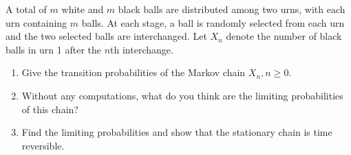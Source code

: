 \begin{exercise}%
\label{ex:markov-chains-70}
A total of $m$ white and $m$ black balls are distributed among two urns, with each urn containing $m$ balls. At each stage, a ball is randomly selected from each urn and the two selected balls are interchanged. Let $X_n$ denote the number of black balls in urn 1 after the $n$th interchange.
\begin{enumerate}
\item[(a)] Give the transition probabilities of the Markov chain $X_n, n \ge 0$.
\item[(b)] Without any computations, what do you think are the limiting probabilities of this chain?
\item[(c)] Find the limiting probabilities and show that the stationary chain is time reversible.
\end{enumerate}
\end{exercise}
